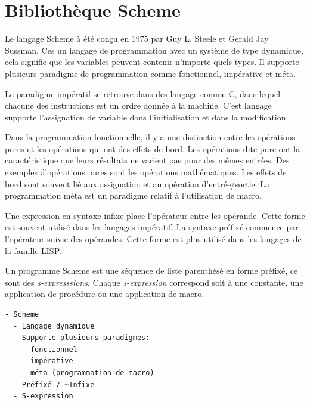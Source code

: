 
\chapter{Bibliothèque Scheme}

Le langage Scheme\cite{Scheme} à été conçu en 1975 par Guy L. Steele et Gerald
Jay Sussman.  Ces un langage de programmation avec un système de type
dynamique, cela signifie que les variables peuvent contenir n'importe quels
types. Il supporte plusieurs paradigme de programmation comme fonctionnel,
impérative et méta.

Le paradigme impératif se retrouve dans des langage comme C, dans lequel chacune
des instructions est un ordre donnée à la machine. C'est langage supporte
l'assignation de variable dans l'initialisation et dans la modification.

Dans la programmation fonctionnelle, il y a une distinction entre les opérations
pures et les opérations qui ont des effets de bord. Les opérations dite pure ont
la caractéristique que leurs résultats ne varient pas pour des mêmes entrées.
Des exemples d'opérations pures sont les opérations mathématiques. Les effets
de bord sont souvent lié aux assignation et au opération d'entrée/sortie. La programmation
méta est un paradigme relatif à l'utilisation de macro.

Une expression en syntaxe infixe place l'opérateur entre les opérande. Cette
forme est souvent utilisé  dans les langages impératif. La syntaxe préfixé
commence par l'opérateur suivie des opérandes. Cette forme est plus utilisé dans les
langages de la famille LISP.

Un programme Scheme est une séquence de liste parenthésé en forme préfixé, ce sont des \textit{s-expresssions}.
Chaque \textit{s-expression} correspond soit à une constante, une application de procédure ou une
application de macro.

\begin{verbatim}
- Scheme
  - Langage dynamique
  - Supporte plusieurs paradigmes:
    - fonctionnel
    - impérative
    - méta (programmation de macro)
  - Préfixé / ~Infixe
  - S-expression
\end{verbatim}


